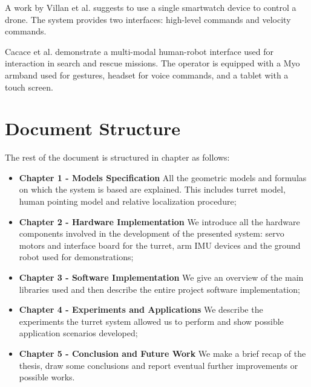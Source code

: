 A work by Villan et al. \cite{Villani2017} suggests to use a single smartwatch device to control a drone. The system provides two interfaces: high-level commands and velocity commands.

Cacace et al. \cite{Cacace2016} demonstrate a multi-modal human-robot interface used for interaction in search and rescue missions. The operator is equipped with a Myo armband used for gestures, headset for voice commands, and a tablet with a touch screen.

\section*{Document Structure}
The rest of the document is structured in chapter as follows:
\begin{itemize}
    \item \textbf{Chapter 1 - Models Specification}  All the geometric models and formulas on which the system is based are explained. This includes turret model, human pointing model and relative localization procedure;
    \item \textbf{Chapter 2 - Hardware Implementation}  We introduce all the hardware components involved in the development of the presented system: servo motors and interface board for the turret, arm IMU devices and the ground robot used for demonstrations;
    \item \textbf{Chapter 3 - Software Implementation} We give an overview of the main libraries used and then describe the entire project software implementation;
    \item \textbf{Chapter 4 - Experiments and Applications} We describe the experiments the turret system allowed us to perform and show possible application scenarios developed;
    \item \textbf{Chapter 5 - Conclusion and Future Work} We make a brief recap of the thesis, draw some conclusions and report eventual further improvements or possible works.
\end{itemize}

